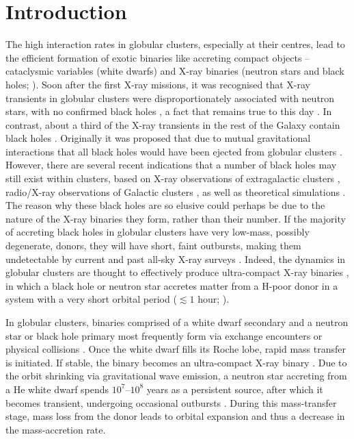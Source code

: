 \documentclass[a4paper,fleqn,usenatbib]{mnras}
\begin{document}
\section{Introduction}

The high interaction rates in globular clusters, especially at their centres, lead to the efficient formation of exotic binaries like accreting compact objects -- cataclysmic variables (white dwarfs) and X-ray binaries (neutron stars and black holes; \citealp{1975ApJ...199L..93C}). Soon after the first X-ray missions, it was recognised that X-ray transients in globular clusters were disproportionately associated with neutron stars, with no confirmed black holes \citep{1995A&A...300..732V}, a fact that remains true to this day \citep{2014ApJ...780..127B}. In contrast, about a third of the X-ray transients in the rest of the Galaxy contain black holes \citep{2015MNRAS.453.3918M, 2016ApJS..222...15T}. Originally it was proposed that due to mutual gravitational interactions that all black holes would have been ejected from globular clusters \citep{1993Natur.364..421K, 1993Natur.364..423S}. However, there are several recent indications that a number of black holes may still exist within clusters, based on X-ray observations of extragalactic clusters \citep{2007Natur.445..183M, 2010ApJ...721..323S, 2010ApJ...725.1805B, 2010ApJ...712L...1I, 2011MNRAS.410.1655M}, radio/X-ray observations of Galactic clusters \citep{2007A&G....48e..12M, 2012Natur.490...71S, 2013ApJ...777...69C, 2015MNRAS.453.3918M}, as well as theoretical simulations \citep{2013MNRAS.430L..30S, 2015ApJ...800....9M, 2016MNRAS.462.2333P}. The reason why these black holes are so elusive could perhaps be due to the nature of the X-ray binaries they form, rather than their number. If the majority of accreting black holes in globular clusters have very low-mass, possibly degenerate, donors, they will have short, faint outbursts, making them undetectable by current and past all-sky X-ray surveys \citep{2014MNRAS.437.3087K}. Indeed, the dynamics in globular clusters are thought to effectively produce ultra-compact X-ray binaries \citep{1987ApJ...312L..23V, 1996ApJ...472L..97D, 2000ApJ...530L..21D, 2005ApJ...621L.109I, 2010ApJ...717..948I}, in which a black hole or neutron star accretes matter from a H-poor donor in a system with a very short orbital period ($\lesssim 1$ hour; \citealp{1986ApJ...304..231N}).

In globular clusters, binaries comprised of a white dwarf secondary and a neutron star or black hole primary most frequently form via exchange encounters or physical collisions \citep{2008MNRAS.386..553I, 2010ApJ...717..948I}. Once the white dwarf fills its Roche lobe, rapid mass transfer is initiated. If stable, the binary becomes an ultra-compact X-ray binary \citep{2012A&A...537A.104V, 2017MNRAS.470L...6S}. Due to the orbit shrinking via gravitational wave emission, a neutron star accreting from a He white dwarf spends $10^7$--$10^8$ years as a persistent source, after which it becomes transient, undergoing occasional outbursts \citep{2012A&A...537A.104V}. During this mass-transfer stage, mass loss from the donor leads to orbital expansion and thus a decrease in the mass-accretion rate.
\end{document}

